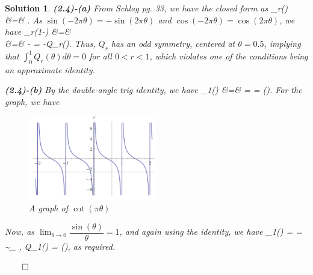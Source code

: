 \documentclass{article} %
\def\eQb#1\eQe{\begin{eqnarray*}#1\end{eqnarray*}}
\theoremstyle{quest}
\newtheorem*{solution}{Solution}
\begin{document}
\begin{solution}
\textbf{(2.4)-(a)} From Schlag pg. 33, we have the closed form as
\eQb
Q_{r}(\theta) &=& .
\eQe
As $\sin(-2\pi \theta) = -\sin(2\pi \theta)$ and $\cos(-2\pi \theta) = \cos(2\pi \theta)$,
we have 
\eQb
Q_{r}(1-\theta) &=&  \\
&=& - = -Q_{r}(\theta). 
\eQe 
Thus, $Q_r$ has an odd symmetry, centered at $\theta = 0.5$, implying that
$\int_{0}^{1} Q_r(\theta) d\theta = 0$ for all $0 < r < 1$, which violates one of the 
conditions being an approximate identity.

\bigskip

\textbf{(2.4)-(b)} By the double-angle trig identity, we have
\eQb
Q_1(\theta) &=&  
=  = \cot(\pi \theta). 
\eQe
For the graph, we have
\begin{figure}[!ht]
  \caption{A graph of $\cot(\pi \theta)$}
  \centering
    \includegraphics[width=0.5\textwidth]{cot}
\end{figure}

Now, as $\lim_{\theta \to 0} \dfrac{\sin(\theta)}{\theta} = 1$, and again using the identity,
 we have
\eQb
Q_1(\theta) = \dfrac{\cos(\pi \theta)}{\sin(\pi \theta)} 
=  \sim_{\theta {}} , 
\>  \> Q_1(\theta) = \Theta(),
\eQe
as required.

\bigskip





\hfill $\qed$
\end{solution}

\bigskip
\end{document}
